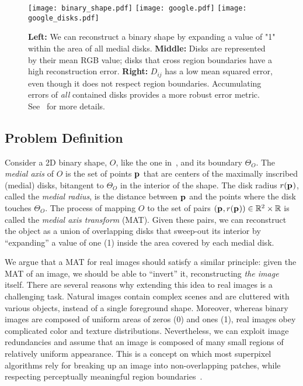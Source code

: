 \documentclass[10pt,twocolumn,letterpaper]{article}
\begin{document}
\begin{figure*}[t]
\centering
\texttt{[image: binary\_shape.pdf]}
\texttt{[image: google.pdf]}\hfill
\texttt{[image: google\_disks.pdf]}
\caption{\textbf{Left:} We can reconstruct a binary shape by expanding a value of "1" within the area of all medial disks.
\textbf{Middle:} Disks are represented by their mean RGB value; disks that cross region boundaries have a high reconstruction error.
\textbf{Right:} $D_{ij}$ has a low mean squared error, even though it does not respect region boundaries.
Accumulating errors of \emph{all} contained disks provides a more robust error metric. See~ for more details.}
\label{fig:method:definition}
\end{figure*}

\subsection{Problem Definition}\label{sec:method:definition}
Consider a 2D binary shape, $O$, like the one in~, and its boundary $\Theta_O$.
The \emph{medial axis} of $O$ is the set of points $\mathbf{p}_{}$ that
are centers of the maximally inscribed (medial) disks, bitangent to $\Theta_O$
in the interior of the shape. The disk radius $r(\mathbf{p}_{})$, called the \emph{medial radius}, 
is the distance between $\mathbf{p}_{}$ and the points where the disk touches $\Theta_O$.
The process of mapping $O$ to the set of pairs $(\mathbf{p}_{},r(\mathbf{p}_{})) \in \mathbb{R}^2 \times \mathbb{R}$
is called the \emph{medial axis transform} (MAT).
Given these pairs, we can reconstruct the object as a union of overlapping disks that sweep-out 
its interior by ``expanding'' a value of one (1) inside the area covered by each  medial disk.

We argue that a MAT for real images should satisfy a similar principle: given the MAT of an image, 
we should be able to ``invert'' it, reconstructing \emph{the image} itself.
There are several reasons why extending this idea to real images is a challenging task. 
Natural images contain complex scenes and are cluttered with various objects, instead of a single foreground shape.
Moreover, whereas binary images are composed of uniform areas of zeros (0) and ones (1), 
real images obey complicated color and texture distributions.
Nevertheless, we can exploit image redundancies and assume that an image is composed of many small regions of 
relatively uniform appearance.
This is a concept on which most superpixel algorithms rely for breaking up an image 
into non-overlapping patches, while respecting perceptually meaningful region 
boundaries~\cite{shi2000normalized,levinshtein2009turbopixels,achanta2012slic}. 
\end{document}
